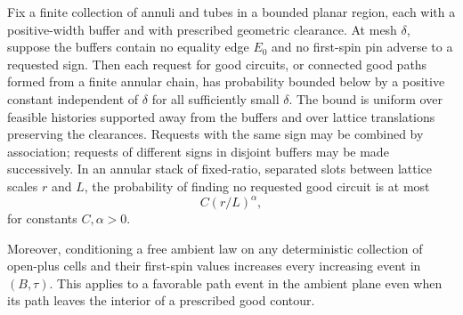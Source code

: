 \begin{lemma}\label{lem:buffer-circuits}
Fix a finite collection of annuli and tubes in a bounded planar region,
each with a positive-width buffer and with prescribed geometric clearance.
At mesh $\delta$, suppose the buffers contain no equality edge $E_0$ and
no first-spin pin adverse to a requested sign. Then each request for good
circuits, or connected good paths formed from a finite annular chain, has
probability bounded below by a positive constant independent of $\delta$
for all sufficiently small $\delta$. The bound is uniform over feasible
histories supported away from the buffers and over lattice translations
preserving the clearances. Requests with the same sign may be combined by
association; requests of different signs in disjoint buffers may be made
successively. In an annular stack of fixed-ratio, separated slots between
lattice scales $r$ and $L$, the probability of finding no requested good
circuit is at most
\begin{equation}\label{discrete:stack}
 C(r/L)^\alpha,
\end{equation}
for constants $C,\alpha>0$.

Moreover, conditioning a free ambient law on any deterministic collection
of open-plus cells and their first-spin values increases every increasing
event in $(B,\tau)$. This applies to a favorable path event in the ambient
plane even when its path leaves the interior of a prescribed good contour.
\end{lemma}
